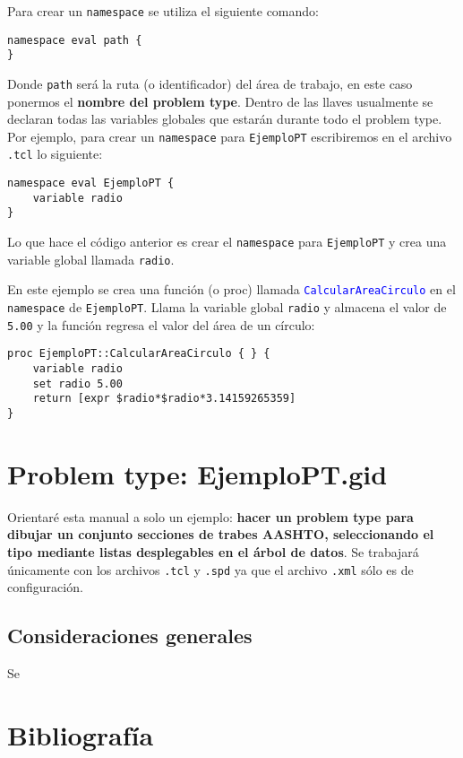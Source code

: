 \documentclass[10pt, a4paper, twocolumn]{article} %
\begin{document}
Para crear un \texttt{namespace} se utiliza el siguiente comando:

\lstset{language=tcl} 
\begin{lstlisting}
namespace eval path {
}
\end{lstlisting}

Donde \texttt{path} será la ruta (o identificador) del área de trabajo, en este caso ponermos el \textbf{nombre del problem type}. Dentro de las llaves usualmente se declaran todas las variables globales que estarán durante todo el problem type. Por ejemplo, para crear un \texttt{namespace} para \texttt{EjemploPT} escribiremos en el archivo \texttt{.tcl} lo siguiente:

\lstset{language=tcl} 
\begin{lstlisting}
namespace eval EjemploPT {
	variable radio
}
\end{lstlisting}

Lo que hace el código anterior es crear el \texttt{namespace} para \texttt{EjemploPT} y crea una variable global llamada \texttt{radio}.

En este ejemplo se crea una función (o proc) llamada \textcolor{blue}{\texttt{CalcularAreaCirculo}} en el \texttt{namespace} de \texttt{EjemploPT}. Llama la variable global \texttt{radio} y almacena el valor de \texttt{5.00} y la función regresa el valor del área de un círculo:

\lstset{language=tcl} 
\begin{lstlisting}
proc EjemploPT::CalcularAreaCirculo { } {
	variable radio	
	set radio 5.00
	return [expr $radio*$radio*3.14159265359]
}
\end{lstlisting}

 
\section{Problem type: EjemploPT.gid}

Orientaré esta manual a solo un ejemplo: \textbf{hacer un problem type para dibujar un conjunto secciones de trabes AASHTO, seleccionando el tipo mediante listas desplegables en el árbol de datos}. Se trabajará únicamente con los archivos \texttt{.tcl} y \texttt{.spd} ya que el archivo \texttt{.xml} sólo es de configuración.

\subsection{Consideraciones generales}

Se




\section{Bibliografía}


\end{document}
